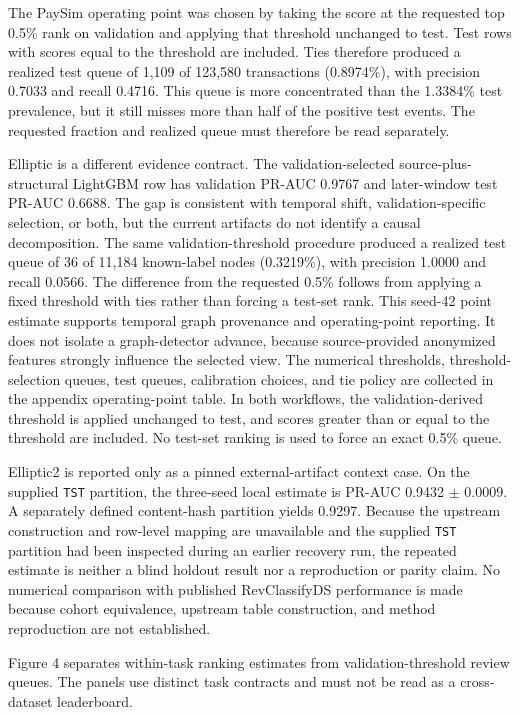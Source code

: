 \documentclass[11pt]{article}
\begin{document}
The PaySim operating point was chosen by taking the score at the requested top 0.5\% rank on validation and applying that threshold unchanged to test. Test rows with scores equal to the threshold are included. Ties therefore produced a realized test queue of 1,109 of 123,580 transactions (0.8974\%), with precision 0.7033 and recall 0.4716. This queue is more concentrated than the 1.3384\% test prevalence, but it still misses more than half of the positive test events. The requested fraction and realized queue must therefore be read separately.

Elliptic is a different evidence contract. The validation-selected source-plus-structural LightGBM row has validation PR-AUC 0.9767 and later-window test PR-AUC 0.6688. The gap is consistent with temporal shift, validation-specific selection, or both, but the current artifacts do not identify a causal decomposition. The same validation-threshold procedure produced a realized test queue of 36 of 11,184 known-label nodes (0.3219\%), with precision 1.0000 and recall 0.0566. The difference from the requested 0.5\% follows from applying a fixed threshold with ties rather than forcing a test-set rank. This seed-42 point estimate supports temporal graph provenance and operating-point reporting. It does not isolate a graph-detector advance, because source-provided anonymized features strongly influence the selected view.
The numerical thresholds, threshold-selection queues, test queues, calibration choices, and tie policy are collected in the appendix operating-point table. In both workflows, the validation-derived threshold is applied unchanged to test, and scores greater than or equal to the threshold are included. No test-set ranking is used to force an exact 0.5\% queue.

\mbox{Elliptic2} is reported only as a pinned external-artifact context case. On the supplied \nolinkurl{TST} partition, the three-seed local estimate is PR-AUC 0.9432 \ensuremath{\pm} 0.0009. A separately defined content-hash partition yields 0.9297. Because the upstream construction and row-level mapping are unavailable and the supplied \nolinkurl{TST} partition had been inspected during an earlier recovery run, the repeated estimate is neither a blind holdout result nor a reproduction or parity claim. No numerical comparison with published RevClassifyDS performance is made because cohort equivalence, upstream table construction, and method reproduction are not established.

Figure 4 separates within-task ranking estimates from validation-threshold review queues. The panels use distinct task contracts and must not be read as a cross-dataset leaderboard.
\end{document}
